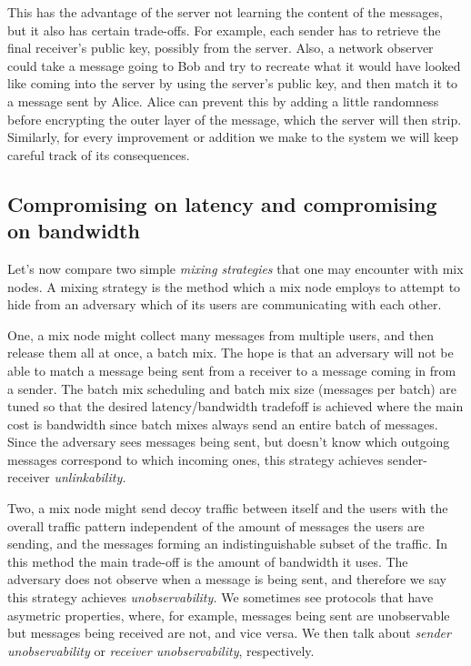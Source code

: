 \documentclass{article}
\begin{document}
\noindent This has the advantage of the server not learning the content of the messages, but it also has certain trade-offs. For example, each sender has to retrieve the final receiver's public key, possibly from the server. Also, a network observer could take a message going to Bob and try to recreate what it would have looked like coming into the server by using the server's public key, and then match it to a message sent by Alice. Alice can prevent this by adding a little randomness before encrypting the outer layer of the message, which the server will then strip. Similarly, for every improvement or addition we make to the system we will keep careful track of its consequences.


\subsection{Compromising on latency and compromising on bandwidth}
Let's now compare two simple \textit{mixing strategies} that one may encounter with mix nodes. A mixing strategy is the method which a mix node employs to attempt to hide from an adversary which of its users are communicating with each other. 

One, a mix node might collect many messages from multiple users, and then release them all at once, a batch mix. The hope is that an adversary will not be able to match a message being sent from a receiver to a message coming in from a sender. The batch mix scheduling and batch mix size (messages per batch) are tuned so that the desired latency/bandwidth 
tradefoff is achieved where the main cost is bandwidth since batch mixes always send an entire batch of messages. Since the adversary sees messages being sent, but doesn't know which outgoing messages correspond to which incoming ones, this strategy achieves sender-receiver \textit{unlinkability.} 

Two, a mix node might send decoy traffic between itself and the users with the overall traffic pattern independent of the amount of messages the users are sending, and the messages forming an indistinguishable subset of the traffic. In this method the main trade-off is the amount of bandwidth it uses. The adversary does not observe when a message is being sent, and therefore we say this strategy achieves \textit{unobservability.} We sometimes see protocols that have asymetric properties, where, for example, messages being sent are unobservable but messages being received are not, and vice versa. We then talk about \textit{sender unobservability} or \textit{receiver unobservability}, respectively.
\end{document}
